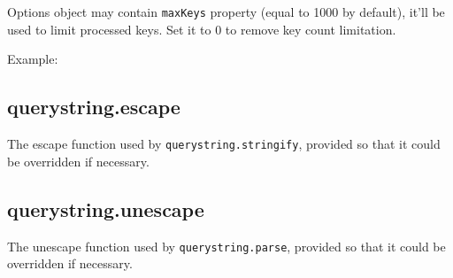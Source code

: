 Options object may contain \texttt{maxKeys} property (equal to 1000 by
default), it'll be used to limit processed keys. Set it to 0 to remove
key count limitation.

Example:

\begin{Shaded}
\begin{Highlighting}[]
\NormalTok{(}\NormalTok{)}
\NormalTok{\{ }\NormalTok{: }\NormalTok{, }\NormalTok{: [}\NormalTok{, }\NormalTok{], }\NormalTok{: } \NormalTok{\}}
\end{Highlighting}
\end{Shaded}

\subsection{querystring.escape}

The escape function used by \texttt{querystring.stringify}, provided so
that it could be overridden if necessary.

\subsection{querystring.unescape}

The unescape function used by \texttt{querystring.parse}, provided so
that it could be overridden if necessary.
